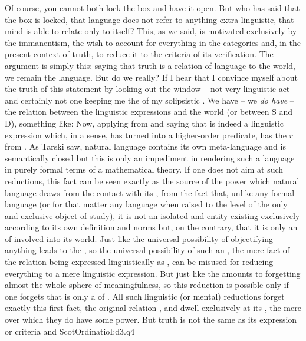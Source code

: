 Of course, you cannot both lock the box and have it open. But who has said that the
box is locked, that language does not refer to anything extra-linguistic, that
mind is able to relate only to itself? This, as we said, is motivated
exclusively by the immanentism, the wish to account for everything in the
 categories and, in the present context of truth, to reduce it to
the  criteria of its verification.  
The argument is simply this: saying that truth is a
relation of language to the world, we remain  the
language. But do we really? If I hear that
I convince myself about the truth of this statement by looking
out the window -- not very linguistic act and certainly not one keeping me
 the  of my solipsistic .
We have -- we {\em do have} -- the relation between the linguistic expressions and
the world (or between S and D), something like:
%
Now, applying  from  and saying that
%
is indeed a linguistic expression which, in a sense, has turned 
into a higher-order predicate, has  the $r$ from
. As Tarski saw, natural language contains its own meta-language
and is semantically closed but this is only an impediment in rendering such a
language in purely formal terms of a mathematical theory. If one does not aim at
such reductions, this fact can be seen exactly as the source of the power which
natural language draws from the contact with its , from the fact
that, unlike any formal language (or for that matter any language when raised to
the level of the only and exclusive object of study), it is not an isolated and
 entity existing exclusively according to its own definition and
norms but, on the contrary, that it is only an  of 
involved into its world.  Just like the universal possibility of {objectifying}
anything leads to the , so the universal possibility
of such an , the mere fact of the relation 
being expressed linguistically as , can be misused for reducing
everything to a mere linguistic expression.  But just like the  amounts to forgetting almost the whole sphere of 
meaningfulness, so this reduction is possible only if one forgets that
 is only a  of .  All such
linguistic (or mental) reductions forget exactly this first fact, the original
relation , and dwell exclusively at its 
, the mere  over which they do have some power. But
truth is not the same as its expression or criteria and \citet{the thing
  [statement] which is true can be know before its truth is
  known.}{ScotOrdinatio}{I:d3.q4}

